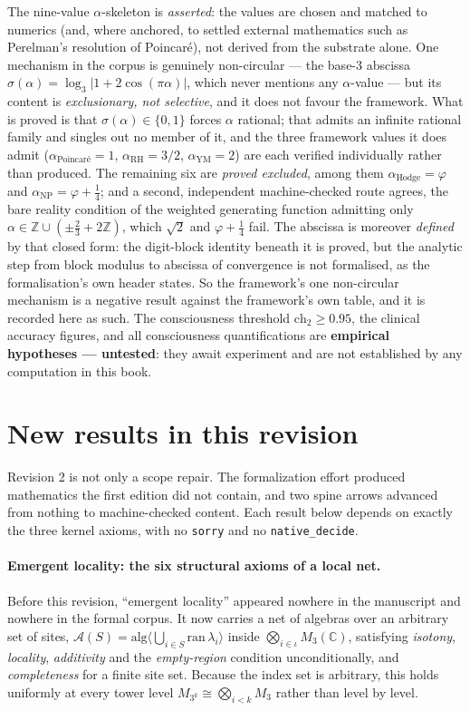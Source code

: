 The nine-value $\alpha$-skeleton is \emph{asserted}: the values are chosen and
matched to numerics (and, where anchored, to settled external mathematics such
as Perelman's resolution of Poincar\'e), not derived from the substrate alone.
One mechanism in the corpus is genuinely non-circular --- the base-3 abscissa
$\sigma(\alpha)=\log_3\lvert 1+2\cos(\pi\alpha)\rvert$, which never mentions
any $\alpha$-value --- but its content is \emph{exclusionary, not selective},
and it does not favour the framework. What is proved is that
$\sigma(\alpha)\in\{0,1\}$ forces $\alpha$ rational; that admits an infinite
rational family and singles out no member of it, and the three framework values
it does admit ($\alpha_{\text{Poincar\'e}}=1$, $\alpha_{\text{RH}}=3/2$,
$\alpha_{\text{YM}}=2$) are each verified individually rather than produced.
The remaining six are \emph{proved excluded}, among them
$\alpha_{\text{Hodge}}=\varphi$ and $\alpha_{\text{NP}}=\varphi+\tfrac14$;
and a second, independent machine-checked route agrees, the bare reality
condition of the weighted generating function admitting only
$\alpha\in\mathbb{Z}\cup(\pm\tfrac23+2\mathbb{Z})$, which $\sqrt2$ and
$\varphi+\tfrac14$ fail. The abscissa is moreover \emph{defined} by that closed
form: the digit-block identity beneath it is proved, but the analytic step from
block modulus to abscissa of convergence is not formalised, as the
formalisation's own header states. So the framework's one non-circular
mechanism is a negative result against the framework's own table, and it is
recorded here as such. The
consciousness threshold $\mathrm{ch}_2 \ge 0.95$, the clinical accuracy figures,
and all consciousness quantifications are \textbf{empirical hypotheses --- untested}:
they await experiment and are not established by any computation in this book.

\section*{New results in this revision}

Revision 2 is not only a scope repair. The formalization effort produced
mathematics the first edition did not contain, and two spine arrows advanced
from nothing to machine-checked content. Each result below depends on exactly
the three kernel axioms, with no \texttt{sorry} and no \texttt{native\_decide}.

\paragraph{Emergent locality: the six structural axioms of a local net.}
Before this revision, ``emergent locality'' appeared nowhere in the manuscript
and nowhere in the formal corpus. It now carries a net of algebras over an
arbitrary set of sites,
$\mathcal{A}(S) = \mathrm{alg}\langle \bigcup_{i \in S} \mathrm{ran}\,\lambda_i \rangle$
inside $\bigotimes_{i \in \iota} M_3(\mathbb{C})$, satisfying \emph{isotony},
\emph{locality}, \emph{additivity} and the \emph{empty-region} condition
unconditionally, and \emph{completeness} for a finite site set. Because the
index set is arbitrary, this holds uniformly at every tower level
$M_{3^k} \cong \bigotimes_{i<k} M_3$ rather than level by level.

